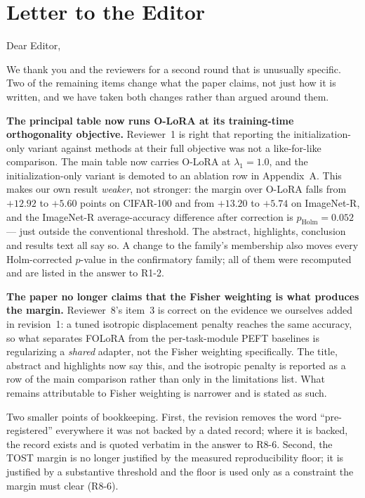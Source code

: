 \section*{Letter to the Editor}

Dear Editor,

We thank you and the reviewers for a second round that is unusually specific. Two of the
remaining items change what the paper claims, not just how it is written, and we have taken
both changes rather than argued around them.

\textbf{The principal table now runs O-LoRA at its training-time orthogonality objective.}
Reviewer~1 is right that reporting the initialization-only variant against methods at their
full objective was not a like-for-like comparison. The main table now carries O-LoRA at
$\lambda_1{=}1.0$, and the initialization-only variant is demoted to an ablation row in
Appendix~A. This makes our own result \emph{weaker}, not stronger: the
margin over O-LoRA falls from $+12.92$ to $+5.60$ points on CIFAR-100 and from $+13.20$ to
$+5.74$ on ImageNet-R, and the ImageNet-R average-accuracy difference after correction is
$p_{\mathrm{Holm}}{=}0.052$ --- just outside the conventional threshold. The abstract,
highlights, conclusion and results text all say so. A change to the family's membership also
moves every Holm-corrected $p$-value in the confirmatory family; all of them were recomputed
and are listed in the answer to R1-2.

\textbf{The paper no longer claims that the Fisher weighting is what produces the margin.}
Reviewer~8's item~3 is correct on the evidence we ourselves added in revision~1: a tuned
isotropic displacement penalty reaches the same accuracy, so what separates FOLoRA from the
per-task-module PEFT baselines is regularizing a \emph{shared} adapter, not the Fisher
weighting specifically. The title, abstract and highlights now say this, and the isotropic
penalty is reported as a row of the main comparison rather than only in the limitations
list. What remains attributable to Fisher weighting is narrower and is stated as such.

Two smaller points of bookkeeping. First, the revision removes the word
``pre-registered'' everywhere it was not backed by a dated record; where it is backed, the
record exists and is quoted verbatim in the answer to R8-6. Second, the TOST margin is no
longer justified by the measured reproducibility floor; it is justified by a substantive
threshold and the floor is used only as a constraint the margin must clear (R8-6).

